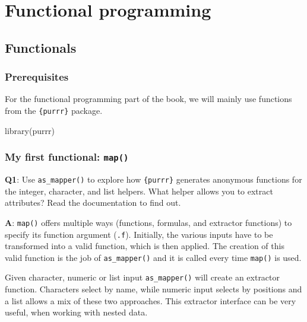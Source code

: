 \documentclass[
]{krantz}
\makeatletter
\newenvironment{Shaded}{\begin{snugshade}}{\end{snugshade}}
\newcommand{\KeywordTok}[1]{\textcolor[rgb]{0.13,0.29,0.53}{\textbf{#1}}}
\newcommand{\NormalTok}[1]{#1}
\newenvironment{kframe}{%
\medskip{}
\setlength{\fboxsep}{.8em}
 \def\at@end@of@kframe{}%
 \ifinner\ifhmode%
  \def\at@end@of@kframe{\end{minipage}}%
  \begin{minipage}{\columnwidth}%
 \fi\fi%
 \def\FrameCommand##1{\hskip\@totalleftmargin \hskip-\fboxsep
 \colorbox{shadecolor}{##1}\hskip-\fboxsep
     \hskip-\linewidth \hskip-\@totalleftmargin \hskip\columnwidth}%
 \MakeFramed {\advance\hsize-\width
   \@totalleftmargin\z@ \linewidth\hsize
   \@setminipage}}%
 {\par\unskip\endMakeFramed%
 \at@end@of@kframe}
\renewenvironment{Shaded}{\begin{kframe}}{\end{kframe}}
\renewcommand{\KeywordTok} [1]{\textcolor[rgb]{0.00,0.44,0.13}{{#1}}}
\renewcommand{\NormalTok}  [1]{{#1}}
\makeatother
\begin{document}
\hypertarget{part-functional-programming}{%
\part{Functional programming}\label{part-functional-programming}}

\hypertarget{functionals}{%
\chapter{Functionals}\label{functionals}}

\hypertarget{prerequisites-3}{%
\section*{Prerequisites}\label{prerequisites-3}}


For the functional programming part of the book, we will mainly use functions from the \texttt{\{purrr\}} package.

\begin{Shaded}
\begin{Highlighting}[]
\KeywordTok{library}\NormalTok{(purrr)}
\end{Highlighting}
\end{Shaded}


\hypertarget{my-first-functional-map}{%
\section{\texorpdfstring{My first functional: \texttt{map()}}{My first functional: map()}}\label{my-first-functional-map}}

\textbf{{Q1}}: Use \texttt{as\_mapper()} to explore how \texttt{\{purrr\}} generates anonymous functions for the integer, character, and list helpers. What helper allows you to extract attributes? Read the documentation to find out.

\textbf{{A}}: \texttt{map()} offers multiple ways (functions, formulas, and extractor functions) to specify its function argument (\texttt{.f}). Initially, the various inputs have to be transformed into a valid function, which is then applied. The creation of this valid function is the job of \texttt{as\_mapper()} and it is called every time \texttt{map()} is used.

Given character, numeric or list input \texttt{as\_mapper()} will create an extractor function. Characters select by name, while numeric input selects by positions and a list allows a mix of these two approaches. This extractor interface can be very useful, when working with nested data.
\end{document}

